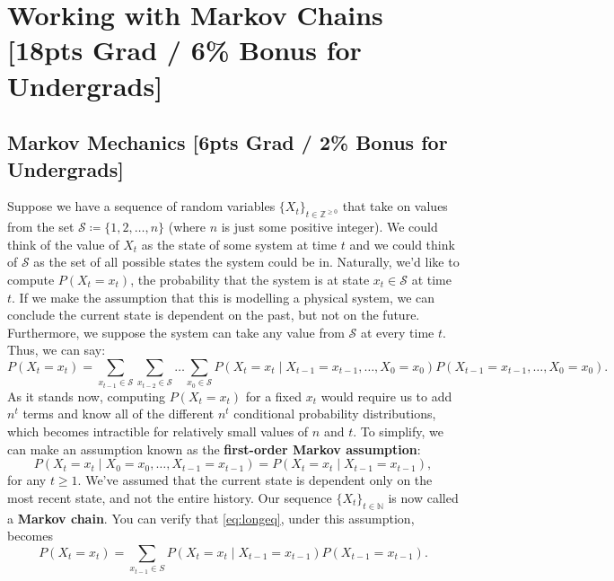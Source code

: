\section{Working with Markov Chains [18pts Grad / 6\% Bonus for Undergrads]}



\subsection{Markov Mechanics [6pts Grad / 2\% Bonus for Undergrads]}
Suppose we have a sequence of random variables $\{X_t\}_{t \in \mathbb{Z}^{\ge 0}}$ that take on values from the set $\mathcal{S} \coloneq \{1, 2, \dots, n\}$ (where $n$ is just some positive integer). We could think of the value of $X_t$ as the state of some system at time $t$ and we could think of $\mathcal{S}$ as the set of all possible states the system could be in. Naturally, we'd like to compute $P(X_t = x_t)$, the probability that the system is at state $x_t \in \mathcal{S}$ at time $t$. If we make the assumption that this is modelling a physical system, we can conclude the current state is dependent on the past, but not on the future. Furthermore, we suppose the system can take any value from $\mathcal{S}$ at every time $t$. Thus, we can say:
\begin{equation} \label{eq:longeq}
    P(X_t = x_t) = \sum_{x_{t - 1} \in \mathcal{S}}\sum_{x_{t - 2} \in \mathcal{S}} \dots \sum_{x_{0} \in \mathcal{S}}P(X_t = x_t \mid X_{t - 1} = x_{t - 1}, \dots, X_0 = x_0)P(X_{t - 1} = x_{t - 1}, \dots, X_0 = x_0).
\end{equation}
As it stands now, computing $P(X_t = x_t)$ for a fixed $x_t$ would require us to add $n^t$ terms and know all of the different $n^t$ conditional probability distributions, which becomes intractible for relatively small values of $n$ and $t$. To simplify, we can make an assumption known as the \textbf{first-order Markov assumption}:
$$P(X_t = x_t \mid X_0 = x_0, \dots, X_{t - 1} = x_{t - 1}) = P(X_t = x_t \mid X_{t - 1} = x_{t - 1}),$$
for any $t \geq 1$. We've assumed that the current state is dependent only on the most recent state, and not the entire history. Our sequence $\{X_t\}_{t \in \mathbb{N}}$ is now called a \textbf{Markov chain}. You can verify that \eqref{eq:longeq}, under this assumption, becomes
$$P(X_t = x_t) = \sum_{x_{t - 1} \in S} P(X_t = x_t \mid X_{t - 1} = x_{t - 1})P(X_{t - 1} = x_{t - 1}).$$
